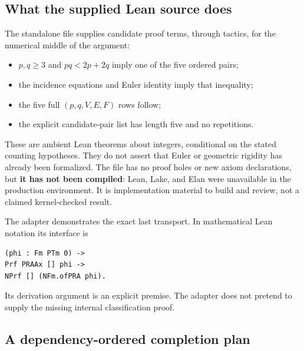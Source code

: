 \subsection{What the supplied Lean source does}

The standalone file  supplies candidate
proof terms, through tactics, for the numerical middle of the argument:
\begin{itemize}
\item $p,q\geq3$ and $pq<2p+2q$ imply one of the five ordered pairs;
\item the incidence equations and Euler identity imply that inequality;
\item the five full $(p,q,V,E,F)$ rows follow;
\item the explicit candidate-pair list has length five and no repetitions.
\end{itemize}
These are ambient Lean theorems about integers, conditional on the
stated counting hypotheses. They do not assert that Euler or geometric
rigidity has already been formalized. The file has no proof holes or
new axiom declarations, but \textbf{it has not been compiled}: Lean,
Lake, and Elan were unavailable in the production environment.
It is implementation material to build and review, not a claimed
kernel-checked result.

The adapter  demonstrates the exact
last transport. In mathematical Lean notation its interface is
\begin{verbatim}
(phi : Fm PTm 0) ->
Prf PRAAx [] phi ->
NPrf [] (NFm.ofPRA phi).
\end{verbatim}
Its derivation argument is an explicit premise. The adapter does not
pretend to supply the missing internal classification proof.

\subsection{A dependency-ordered completion plan}

